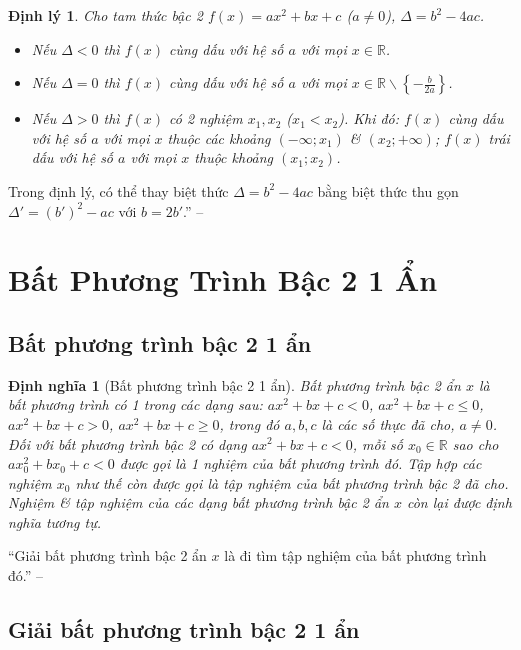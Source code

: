 \documentclass[oneside]{book}
\numberwithin{equation}{section}
\newtheorem{dinhnghia}{Định nghĩa}[section]
\newtheorem{dinhly}{Định lý}[section]
\begin{document}
\begin{dinhly}
	Cho tam thức bậc 2 $f(x) = ax^2 + bx + c$ ($a\ne 0$), $\Delta = b^2 - 4ac$.
	\begin{itemize}
		\item Nếu $\Delta < 0$ thì $f(x)$ cùng dấu với hệ số $a$ với mọi $x\in\mathbb{R}$.
		\item Nếu $\Delta = 0$ thì $f(x)$ cùng dấu với hệ số $a$ với mọi $x\in\mathbb{R}\backslash\left\{-\frac{b}{2a}\right\}$.
		\item Nếu $\Delta > 0$ thì $f(x)$ có 2 nghiệm $x_1,x_2$ ($x_1 < x_2$). Khi đó: $f(x)$ cùng dấu với hệ số $a$ với mọi $x$ thuộc các khoảng $(-\infty;x_1)$ \& $(x_2;+\infty)$; $f(x)$ trái dấu với hệ số $a$ với mọi $x$ thuộc khoảng $(x_1;x_2)$.
	\end{itemize}
\end{dinhly}
Trong định lý, có thể thay biệt thức $\Delta = b^2 - 4ac$ bằng biệt thức thu gọn $\Delta' = (b')^2 - ac$ với $b = 2b'$.'' -- \cite[p. 46]{SGK_Toan_10_Canh_Dieu_tap_1}

\section{Bất Phương Trình Bậc 2 1 Ẩn}

\subsection{Bất phương trình bậc 2 1 ẩn}

\begin{dinhnghia}[Bất phương trình bậc 2 1 ẩn]
	\emph{Bất phương trình bậc 2 ẩn $x$} là bất phương trình có 1 trong các dạng sau: $ax^2 + bx + c < 0$, $ax^2 + bx + c\le 0$, $ax^2 + bx + c > 0$, $ax^2 + bx + c\ge 0$, trong đó $a,b,c$ là các số thực đã cho, $a\ne 0$. Đối với bất phương trình bậc 2 có dạng $ax^2 + bx + c < 0$, mỗi số $x_0\in\mathbb{R}$ sao cho $ax_0^2 + bx_0 + c < 0$ được gọi là 1 \emph{nghiệm} của bất phương trình đó. Tập hợp các nghiệm $x_0$ như thế còn được gọi là \emph{tập nghiệm} của bất phương trình bậc 2 đã cho. Nghiệm \& tập nghiệm của các dạng bất phương trình bậc 2 ẩn $x$ còn lại được định nghĩa tương tự.
\end{dinhnghia}
``Giải bất phương trình bậc 2 ẩn $x$ là đi tìm tập nghiệm của bất phương trình đó.'' -- \cite[p. 49]{SGK_Toan_10_Canh_Dieu_tap_1}

\subsection{Giải bất phương trình bậc 2 1 ẩn}
\end{document}
